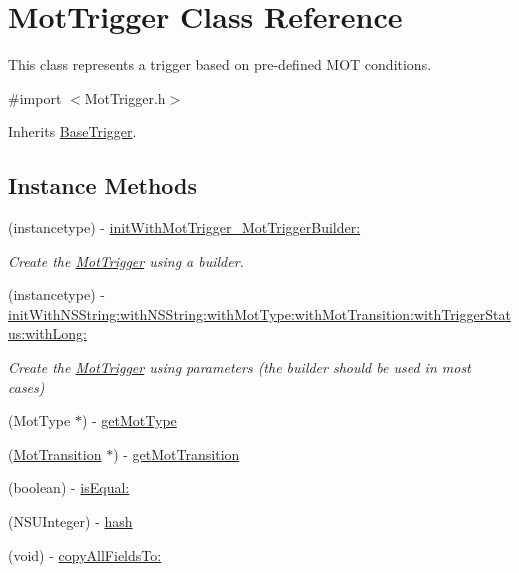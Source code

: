 \hypertarget{interface_mot_trigger}{}\section{Mot\+Trigger Class Reference}
\label{interface_mot_trigger}


This class represents a trigger based on pre-\/defined M\+O\+T conditions.  




{\ttfamily \#import $<$Mot\+Trigger.\+h$>$}



Inherits \hyperlink{interface_base_trigger}{Base\+Trigger}.

\subsection*{Instance Methods}
\begin{DoxyCompactItemize}
\item 
(instancetype) -\/ \hyperlink{interface_mot_trigger_a9f4593395fffe5e30216e2545dd6f49e}{init\+With\+Mot\+Trigger\+\_\+\+Mot\+Trigger\+Builder\+:}
\begin{DoxyCompactList}\small\item\em Create the \hyperlink{interface_mot_trigger}{Mot\+Trigger} using a builder. \end{DoxyCompactList}\item 
(instancetype) -\/ \hyperlink{interface_mot_trigger_a881fa71171afec08899d68bb80401f3c}{init\+With\+N\+S\+String\+:with\+N\+S\+String\+:with\+Mot\+Type\+:with\+Mot\+Transition\+:with\+Trigger\+Status\+:with\+Long\+:}
\begin{DoxyCompactList}\small\item\em Create the \hyperlink{interface_mot_trigger}{Mot\+Trigger} using parameters (the builder should be used in most cases) \end{DoxyCompactList}\item 
(Mot\+Type $\ast$) -\/ \hyperlink{interface_mot_trigger_ad241a1319c77daca6b47a0d5d7a7618f}{get\+Mot\+Type}
\item 
(\hyperlink{interface_mot_transition}{Mot\+Transition} $\ast$) -\/ \hyperlink{interface_mot_trigger_ad241fcc610b0fa9b4f5d68517ad3c506}{get\+Mot\+Transition}
\item 
(boolean) -\/ \hyperlink{interface_mot_trigger_a382dfd9b46af2393880fc52b8d5f4bef}{is\+Equal\+:}
\item 
(N\+S\+U\+Integer) -\/ \hyperlink{interface_mot_trigger_ab3975befa6b4a3265e4e382a405b1c35}{hash}
\item 
(void) -\/ \hyperlink{interface_mot_trigger_a9e8dffd0285d7df22efc44ef1e1b2d63}{copy\+All\+Fields\+To\+:}
\end{DoxyCompactItemize}
